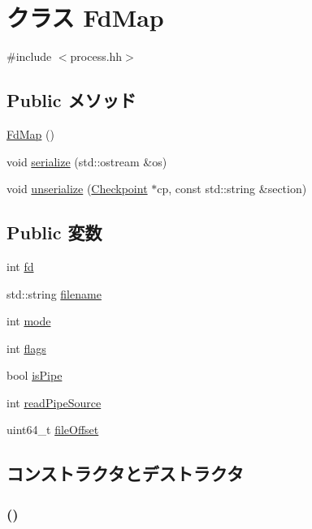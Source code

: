 \hypertarget{classProcess_1_1FdMap}{
\section{クラス FdMap}
\label{classProcess_1_1FdMap}
}


{\ttfamily \#include $<$process.hh$>$}\subsection*{Public メソッド}
\begin{DoxyCompactItemize}
\item 
\hyperlink{classProcess_1_1FdMap_a6b68970055ea3a7a7e707094013696f8}{FdMap} ()
\item 
void \hyperlink{classProcess_1_1FdMap_a53e036786d17361be4c7320d39c99b84}{serialize} (std::ostream \&os)
\item 
void \hyperlink{classProcess_1_1FdMap_af22e5d6d660b97db37003ac61ac4ee49}{unserialize} (\hyperlink{classCheckpoint}{Checkpoint} $\ast$cp, const std::string \&section)
\end{DoxyCompactItemize}
\subsection*{Public 変数}
\begin{DoxyCompactItemize}
\item 
int \hyperlink{classProcess_1_1FdMap_a6f8059414f0228f0256115e024eeed4b}{fd}
\item 
std::string \hyperlink{classProcess_1_1FdMap_ae80f820219e45772366a2a68de6a54c4}{filename}
\item 
int \hyperlink{classProcess_1_1FdMap_a1ea5d0cb93f22f7d0fdf804bd68c3326}{mode}
\item 
int \hyperlink{classProcess_1_1FdMap_ac8bf36fe0577cba66bccda3a6f7e80a4}{flags}
\item 
bool \hyperlink{classProcess_1_1FdMap_a9260c74a8a3973a8cb2ac4c6656d5a20}{isPipe}
\item 
int \hyperlink{classProcess_1_1FdMap_abc824a1a926dd34c7050c0ea4ace0d65}{readPipeSource}
\item 
uint64\_\-t \hyperlink{classProcess_1_1FdMap_af57442475b89e86b86478fe902d7c4d1}{fileOffset}
\end{DoxyCompactItemize}


\subsection{コンストラクタとデストラクタ}
\hypertarget{classProcess_1_1FdMap_a6b68970055ea3a7a7e707094013696f8}{
\subsubsection[{FdMap}]{ ()}}
\label{classProcess_1_1FdMap_a6b68970055ea3a7a7e707094013696f8}



